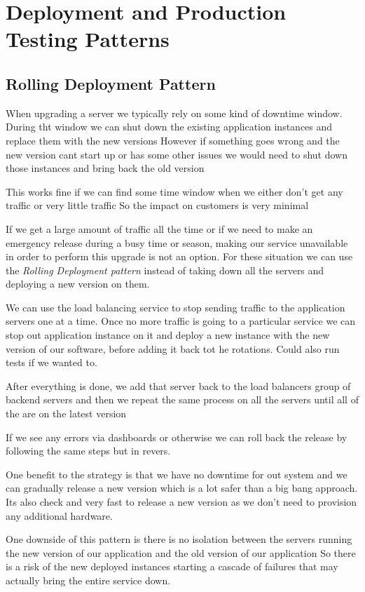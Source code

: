 \documentclass[a4paper, 11pt]{book}
\begin{document}
    \section{Deployment and Production Testing Patterns}

    \subsection{Rolling Deployment Pattern}
    When upgrading a server we typically rely on some kind of downtime window.
    During tht window we can shut down the existing application instances and replace them with the new versions
    However if something goes wrong and the new version cant start up or has some other issues we would need to shut down those instances and bring back the old version

    This works fine if we can find some time window when we either don't get any traffic or very little traffic
    So the impact on customers is very minimal

    If we get a large amount of traffic all the time or if we need to make an emergency release during a busy time or season, making our service unavailable in order to perform this upgrade is not an option.
    For these situation we can use the \textit{Rolling Deployment pattern} instead of taking down all the servers and deploying a new version on them.

    We can use the load balancing service to stop sending traffic to the application servers one at a time.
    Once no more traffic is going to a particular service we can stop out application instance on it and deploy a new instance with the new version of our software, before adding it back tot he rotations.
    Could also run tests if we wanted to.

    After everything is done, we add that server back to the load balancers group of backend servers and then we repeat the same process on all the servers until all of the are on the latest version

    If we see any errors via dashboards or otherwise we can roll back the release by following the same steps but in revers.

    One benefit to the strategy is that we have no downtime for out system and we can gradually release a new version which is a lot safer than a big bang approach.
    Its also check and very fast to release a new version as we don't need to provision any additional hardware.

    One downside of this pattern is there is no isolation between the servers running the new version of our application and the old version of our application
    So there is a risk of the new deployed instances starting a cascade of failures that may actually bring the entire service down.
\end{document}
